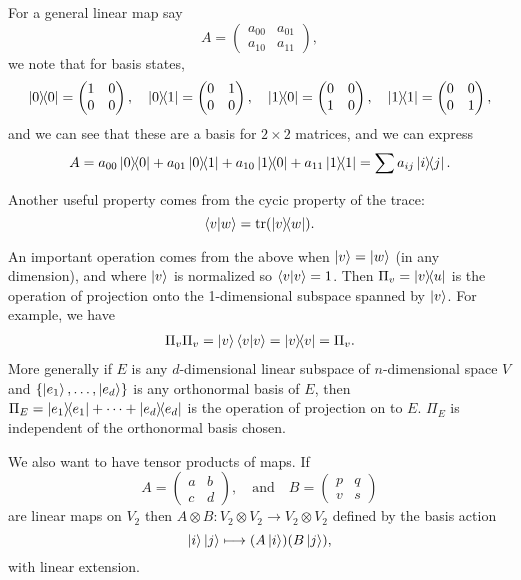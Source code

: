 \documentclass[a4paper]{article}
\begin{document}
For a general linear map say
$$
A = \begin{pmatrix}
	a_{00} & a_{01} \\
	a_{10} & a_{11}
\end{pmatrix},
$$
we note that for basis states,
\begin{align*}
	\op{0}{0} = \begin{pmatrix}
		1 & 0 \\
		0 & 0 
	\end{pmatrix}, \quad \op{0}{1} = \begin{pmatrix}
		0 & 1 \\
		0 & 0 
	\end{pmatrix}, \quad \op{1}{0} = \begin{pmatrix}
		0 & 0 \\
		1 & 0 
	\end{pmatrix}, \quad \op{1}{1} = \begin{pmatrix}
		0 & 0 \\
		0 & 1 
	\end{pmatrix},
\end{align*}
and we can see that these are a basis for $2\times 2$ matrices, and we can express
$$
A = a_{00} \op{0}{0} +  a_{01} \op{0}{1} +  a_{10} \op{1}{0} +  a_{11} \op{1}{1} = \sum a_{ij} \op{i}{j}.
$$

Another useful property comes from the cycic property of the trace:
$$
\ip{v}{w} = \tr(\op{v}{w}).
$$

An important operation comes from the above when $\ket{v} = \ket{w}$ (in any dimension), and where $\ket{v}$ is normalized so $\ip{v}{v} = 1$. Then $\Pi_v = \op{v}{u}$ is the operation of projection onto the 1-dimensional subspace spanned by $\ket{v}$. For example, we have
\begin{align*}
\Pi_v \Pi_v = \ket{v}\ip{v}{v} = \op{v}{v} = \Pi_v.
\end{align*}
More generally if $E$ is any $d$-dimensional linear subspace of $n$-dimensional space $V$ and $\{\ket{e_1}, \dots, \ket{e_d}\}$ is any orthonormal basis of $E$, then $\Pi_E = \op{e_1}{e_1} + \cdots + \op{e_d}{e_d}$ is the operation of projection on to $E$. $\Pi_E$ is independent of the orthonormal basis chosen.

We also want to have tensor products of maps. If 
$$
A = \begin{pmatrix}
	a & b \\ c & d
\end{pmatrix}, \quad \text{and} \quad B= \begin{pmatrix}
	p & q \\ v& s
\end{pmatrix}
$$
are linear maps on $V_2$ then $A \otimes B : V_2 \otimes V_2 \rightarrow V_2 \otimes V_2$ defined by the basis action
$$
\ket{i} \ket{j} \longmapsto (A \ket{i})(B \ket{j}),
$$
with linear extension.
\end{document}
